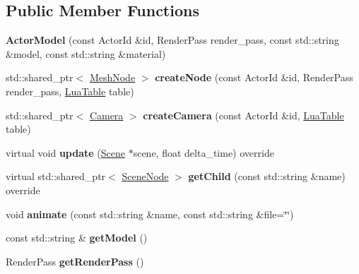 \subsection*{Public Member Functions}
\begin{DoxyCompactItemize}
\item 
\mbox{\label{classTarbora_1_1ActorModel_a1fefe619a840e2bbdf214e5d44962193}} 
{\bfseries Actor\+Model} (const Actor\+Id \&id, Render\+Pass render\+\_\+pass, const std\+::string \&model, const std\+::string \&material)
\item 
\mbox{\label{classTarbora_1_1ActorModel_a444103ab29247d23375fe2a55392fae0}} 
std\+::shared\+\_\+ptr$<$ \hyperlink{classTarbora_1_1MeshNode}{Mesh\+Node} $>$ {\bfseries create\+Node} (const Actor\+Id \&id, Render\+Pass render\+\_\+pass, \hyperlink{classTarbora_1_1LuaTable}{Lua\+Table} table)
\item 
\mbox{\label{classTarbora_1_1ActorModel_a162b40dc0f465add232c332fd7899610}} 
std\+::shared\+\_\+ptr$<$ \hyperlink{classTarbora_1_1Camera}{Camera} $>$ {\bfseries create\+Camera} (const Actor\+Id \&id, \hyperlink{classTarbora_1_1LuaTable}{Lua\+Table} table)
\item 
\mbox{\label{classTarbora_1_1ActorModel_a7c6a17305abb923b03a190e90b4f856e}} 
virtual void {\bfseries update} (\hyperlink{classTarbora_1_1Scene}{Scene} $\ast$scene, float delta\+\_\+time) override
\item 
\mbox{\label{classTarbora_1_1ActorModel_a896fc0026eeed7a5527846711364cd88}} 
virtual std\+::shared\+\_\+ptr$<$ \hyperlink{classTarbora_1_1SceneNode}{Scene\+Node} $>$ {\bfseries get\+Child} (const std\+::string \&name) override
\item 
\mbox{\label{classTarbora_1_1ActorModel_ae6ddda6bd0f911223020741eaa0e7694}} 
void {\bfseries animate} (const std\+::string \&name, const std\+::string \&file=\char`\"{}\char`\"{})
\item 
\mbox{\label{classTarbora_1_1ActorModel_a9c2a219815c5952de9aa1b4cd298b23d}} 
const std\+::string \& {\bfseries get\+Model} ()
\item 
\mbox{\label{classTarbora_1_1ActorModel_a2955e28f4e1ab4fcb81affcbcd04cbd5}} 
Render\+Pass {\bfseries get\+Render\+Pass} ()
\end{DoxyCompactItemize}
